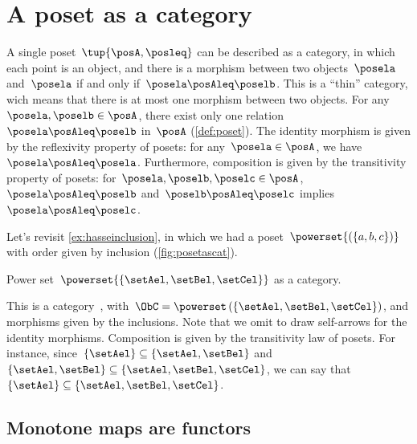 

\section{A poset as a category}
\label{sec:posetsarecats}
A single poset~$\tup{\posA, \posleq}$ can be described as a category, in which each point is an object, and there is a morphism between two objects~$\posela$ and~$\posela$ if and only if~$\posela \posAleq \poselb$.
This is a ``thin'' category, wich means that there is at most one morphism between two objects.
For any~$\posela,\poselb\in \posA$, there exist only one relation~$\posela\posAleq \poselb$ in~$\posA$ (\cref{def:poset}).
The identity morphism is given by the reflexivity property of posets: for any~$\posela\in \posA$, we have~$\posela \posAleq \posela$.
Furthermore, composition is given by the transitivity property of posets: for~$\posela,\poselb,\poselc \in \posA$,~$\posela\posAleq \poselb$ and~$\poselb\posAleq \poselc$ implies~$\posela\posAleq \poselc$.

\begin{example}
  Let's revisit \cref{ex:hasseinclusion}, in which we had a poset~$\powerset{\left(\{a,b,c\}\right)}$ with order given by inclusion (\cref{fig:posetascat}).

  \begin{marginfigure}
    \begin{center}
    \end{center}
    \caption{Power set~$\powerset{\{\setAel,\setBel,\setCel\}}$ as a category. \label{fig:posetascat}}
  \end{marginfigure}

  This is a category~\CatC, with~$\ObC=\powerset\left(\{\setAel,\setBel,\setCel\}\right)$, and morphisms given by the inclusions.
  Note that we omit to draw self-arrows for the identity morphisms.
  Composition is given by the transitivity law of posets. For instance, since~$\{\setAel\}\subseteq \{\setAel,\setBel\}$ and~$\{\setAel,\setBel\} \subseteq \{\setAel,\setBel,\setCel\}$, we can say that~$\{\setAel\}\subseteq \{\setAel,\setBel,\setCel\}$.
\end{example}

\subsection{Monotone maps are functors}


